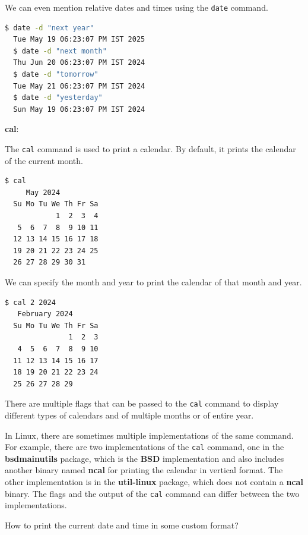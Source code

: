 We can even mention relative dates and times using the \texttt{date} command.

\begin{lstlisting}[language=bash]
  $ date -d "next year"
  Tue May 19 06:23:07 PM IST 2025
  $ date -d "next month"
  Thu Jun 20 06:23:07 PM IST 2024
  $ date -d "tomorrow"
  Tue May 21 06:23:07 PM IST 2024
  $ date -d "yesterday"
  Sun May 19 06:23:07 PM IST 2024
\end{lstlisting}

\textbf{cal}:

The \texttt{cal} command is used to print a calendar.
By default, it prints the calendar of the current month.

\begin{lstlisting}[language=bash]
  $ cal
     May 2024
  Su Mo Tu We Th Fr Sa
            1  2  3  4
   5  6  7  8  9 10 11
  12 13 14 15 16 17 18
  19 20 21 22 23 24 25
  26 27 28 29 30 31
\end{lstlisting}

We can specify the month and year to print the calendar of that month and year.

\begin{lstlisting}[language=bash]
  $ cal 2 2024
   February 2024
  Su Mo Tu We Th Fr Sa
               1  2  3
   4  5  6  7  8  9 10
  11 12 13 14 15 16 17
  18 19 20 21 22 23 24
  25 26 27 28 29
\end{lstlisting}

There are multiple flags that can be passed to the \texttt{cal} command to display different types of calendars and of multiple months or of entire year.

\begin{remark}
  In Linux, there are sometimes multiple implementations of the same command.
  For example, there are two implementations of the \texttt{cal} command, one in the \textbf{bsdmainutils} package, which is the \textbf{BSD} implementation and also includes another binary named \textbf{ncal} for printing the calendar in vertical format.
  The other implementation is in the \textbf{util-linux} package, which does not contain a \textbf{ncal} binary.
  The flags and the output of the \texttt{cal} command can differ between the two implementations.
\end{remark}

\begin{qs}
  How to print the current date and time in some custom format?
\end{qs}

